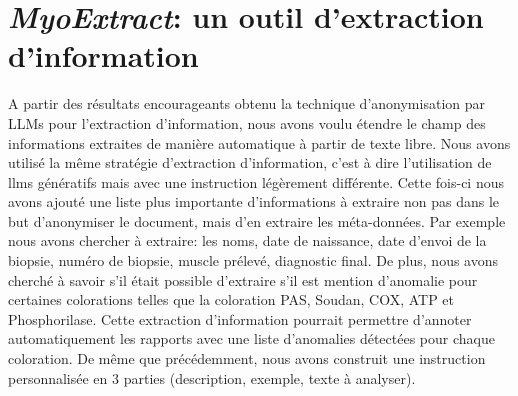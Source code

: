 \section{\textit{MyoExtract}: un outil d'extraction d'information}
A partir des résultats encourageants obtenu la technique d'anonymisation par LLMs pour l'extraction d'information, nous avons voulu étendre le champ des informations extraites de manière automatique à partir de texte libre. Nous avons utilisé la même stratégie d'extraction d'information, c'est à dire l'utilisation de \gls{llms} génératifs mais avec une instruction légèrement différente. Cette fois-ci nous avons ajouté une liste plus importante d'informations à extraire non pas dans le but d'anonymiser le document, mais d'en extraire les méta-données. Par exemple nous avons chercher à extraire: les noms, date de naissance, date d'envoi de la biopsie, numéro de biopsie, muscle prélevé, diagnostic final. De plus, nous avons cherché à savoir s'il était possible d'extraire s'il est mention d'anomalie pour certaines colorations telles que la coloration PAS, Soudan, COX, ATP et Phosphorilase. Cette extraction d'information pourrait permettre d'annoter automatiquement les rapports avec une liste d'anomalies détectées pour chaque coloration. De même que précédemment, nous avons construit une instruction personnalisée en 3 parties (description, exemple, texte à analyser).

